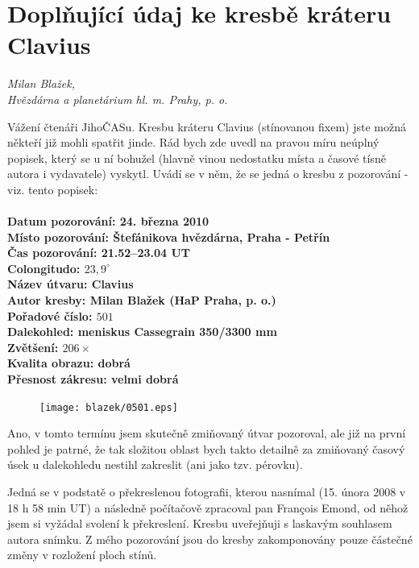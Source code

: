 \documentclass[10pt,a5paper,twoside]{book}
\newcommand{\nadpis}[2]{
\section*{#1}
	\begin{flushright}
	\textit{#2}
	\end{flushright}
}
\begin{document}
\nadpis{Doplňující údaj ke kresbě kráteru Clavius}{Milan Blažek,\\ Hvězdárna a planetárium hl. m. Prahy, p. o.}

Vážení čtenáři JihoČASu. Kresbu kráteru Clavius (stínovanou fixem) jste možná někteří již mohli spatřit jinde. Rád bych zde uvedl na pravou míru neúplný popisek, který se u ní bohužel (hlavně vinou nedostatku místa a časové tísně autora i vydavatele) vyskytl. Uvádí se v něm, že se jedná o kresbu z pozorování - viz. tento popisek:  \\

\textbf{\\
Datum pozorování: 24. března 2010\\
Místo pozorování: Štefánikova hvězdárna, Praha - Petřín\\
Čas pozorování: 21.52–23.04 UT\\
Colongitudo: $23,9 ^\circ$\\
Název útvaru: Clavius\\
Autor kresby: Milan Blažek (HaP Praha, p. o.)\\
Pořadové číslo: $501$\\
Dalekohled: meniskus Cassegrain 350/3300 mm\\
Zvětšení: $206 \times $ \\
Kvalita obrazu: dobrá \\
Přesnost zákresu: velmi dobrá\\}

\newpage
\begin{figure}[htbp]
	\begin{center}
		\texttt{[image: blazek/0501.eps]}
	\end{center}
\end{figure}

Ano, v tomto termínu jsem skutečně zmiňovaný útvar pozoroval, ale již na první pohled je patrné, že tak složitou oblast bych takto detailně za zmiňovaný časový úsek u dalekohledu nestihl zakreslit (ani jako tzv. pérovku).

Jedná se v podstatě o překreslenou fotografii, kterou nasnímal (15. února 2008 v 18 h 58 min UT) a následně počítačově zpracoval pan François Emond, od něhož jsem si vyžádal svolení k překreslení. Kresbu uveřejňuji s laskavým souhlasem autora snímku. Z mého pozorování jsou do kresby zakomponovány pouze částečné změny v rozložení ploch stínů. 
\end{document}
